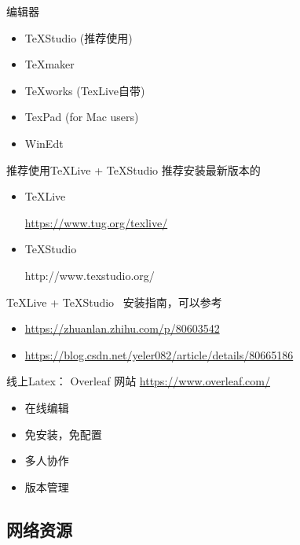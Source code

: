 \documentclass[13pt]{ctexbeamer}
\begin{document}
\begin{frame}{编辑器}
\begin{itemize}
\item  TeXStudio (推荐使用)
\item TeXmaker
\item TeXworks (TexLive自带)
\item TexPad (for Mac users)
\item WinEdt
\end{itemize}
\end{frame}



\begin{frame}{推荐使用TeXLive + TeXStudio }
	推荐安装最新版本的
	
	\begin{itemize}
		\item TeXLive 
		
		\href{https://www.tug.org/texlive/}{https://www.tug.org/texlive/}
		
		
		
		\item TeXStudio
		
		http://www.texstudio.org/
	\end{itemize}
	
	TeXLive + TeXStudio  ~安装指南，可以参考
	\begin{itemize}
		\item 	\href{https://zhuanlan.zhihu.com/p/80603542}{https://zhuanlan.zhihu.com/p/80603542}
		\item \href{https://blog.csdn.net/yeler082/article/details/80665186}{https://blog.csdn.net/yeler082/article/details/80665186}
	\end{itemize}
\end{frame}



\begin{frame}{线上Latex：  Overleaf}
网站 
\href{https://www.overleaf.com/
}{https://www.overleaf.com/
}
\begin{itemize}
\item 在线编辑

\item 免安装，免配置

\item 多人协作

\item 版本管理
\end{itemize}
\end{frame}

\subsection{网络资源}
\end{document}
